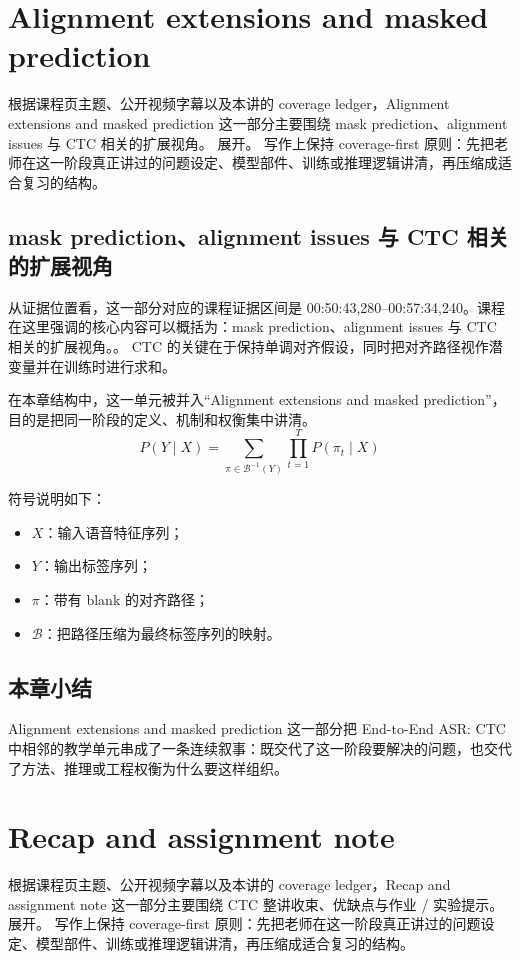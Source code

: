 \documentclass[a4paper]{article}
\begin{document}
\section{Alignment extensions and masked prediction}
根据课程页主题、公开视频字幕以及本讲的 coverage ledger，Alignment extensions and masked prediction 这一部分主要围绕 mask prediction、alignment issues 与 CTC 相关的扩展视角。 展开。
写作上保持 coverage-first 原则：先把老师在这一阶段真正讲过的问题设定、模型部件、训练或推理逻辑讲清，再压缩成适合复习的结构。

\subsection{mask prediction、alignment issues 与 CTC 相关的扩展视角}
从证据位置看，这一部分对应的课程证据区间是 00:50:43,280--00:57:34,240。课程在这里强调的核心内容可以概括为：mask prediction、alignment issues 与 CTC 相关的扩展视角。。
CTC 的关键在于保持单调对齐假设，同时把对齐路径视作潜变量并在训练时进行求和。

在本章结构中，这一单元被并入“Alignment extensions and masked prediction”，目的是把同一阶段的定义、机制和权衡集中讲清。
\[
P(Y \mid X) = \sum_{\pi \in \mathcal{B}^{-1}(Y)} \prod_{t=1}^{T} P(\pi_t \mid X)
\]

符号说明如下：
\begin{itemize}
\item $X$：输入语音特征序列；
\item $Y$：输出标签序列；
\item $\pi$：带有 blank 的对齐路径；
\item $\mathcal{B}$：把路径压缩为最终标签序列的映射。
\end{itemize}

\subsection{本章小结}
Alignment extensions and masked prediction 这一部分把 End-to-End ASR: CTC 中相邻的教学单元串成了一条连续叙事：既交代了这一阶段要解决的问题，也交代了方法、推理或工程权衡为什么要这样组织。

\section{Recap and assignment note}
根据课程页主题、公开视频字幕以及本讲的 coverage ledger，Recap and assignment note 这一部分主要围绕 CTC 整讲收束、优缺点与作业 / 实验提示。 展开。
写作上保持 coverage-first 原则：先把老师在这一阶段真正讲过的问题设定、模型部件、训练或推理逻辑讲清，再压缩成适合复习的结构。
\end{document}
